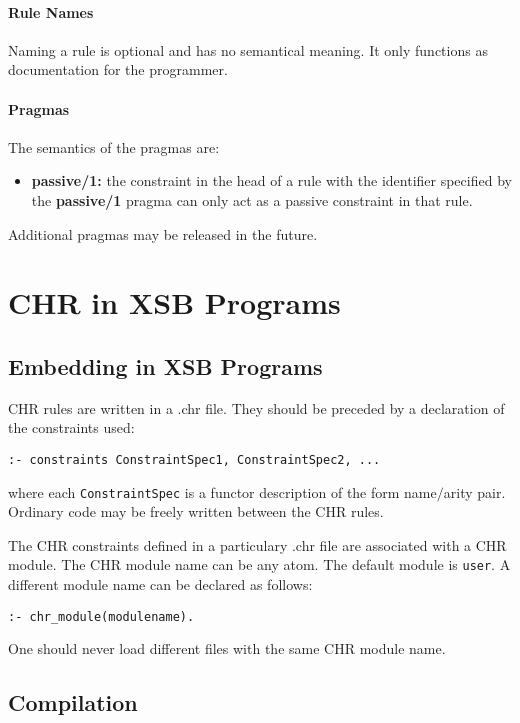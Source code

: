 \paragraph{Rule Names}
Naming a rule is optional and has no semantical meaning. It only functions
as documentation for the programmer.

\paragraph{Pragmas}
The semantics of the pragmas are:
\begin{itemize}
\item \textbf{passive/1:} the constraint in the head of a rule with the identifier specified by
                          the \textbf{passive/1} pragma can only act as a passive constraint in that rule.
\end{itemize}
Additional pragmas may be released in the future.

\section{CHR in XSB Programs} \label{practical}

\subsection{Embedding in XSB Programs}

CHR rules are written in a .chr file. They should be preceded by a declaration of the constraints used:
\begin{verbatim}
:- constraints ConstraintSpec1, ConstraintSpec2, ...
\end{verbatim}
where each \texttt{ConstraintSpec} is a functor description of the form name$\slash$arity pair. Ordinary code
may be freely written between the CHR rules.

The CHR constraints defined in a particulary .chr file are associated
with a CHR module. The CHR module name can be any atom. The default module is
\texttt{user}. A different module name can be declared as follows:
\begin{verbatim}
:- chr_module(modulename).
\end{verbatim}
One should never load different files with the same CHR module name.

\subsection{Compilation}

